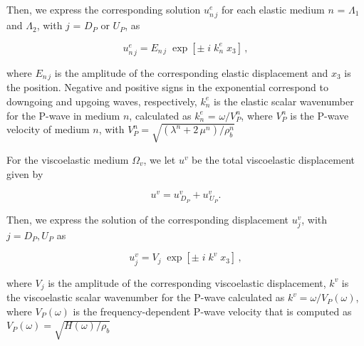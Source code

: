 \documentclass[draft]{agujournal2019}
\begin{document}
Then, we express the corresponding solution $u_{n\,j}^e$ for each elastic medium $n$ = $\Lambda_1$ and $\Lambda_2$, with $j$ = $D_P$ or $U_P$, as
\begin{linenomath*}
\begin{equation}\label{Eq.19}
u_{n\,j}^e = E_{n \,j} \;\exp[ \pm\; i \; k_{n}^e \; x_3 ]\,,
\end{equation}
\end{linenomath*}
where $E_{n \,j}$ is the amplitude of the corresponding elastic displacement and $x_3$ is the position. Negative and positive signs in the exponential correspond to downgoing and upgoing waves, respectively, $ k_{n}^e$ is the elastic scalar wavenumber for the P-wave in medium $n$, calculated as $ k_{n}^e$ = $\omega / V_P^n$, where $V_P^n$ is the P-wave velocity of medium $n$, with $V_P^n = \sqrt{(\lambda^n +  2\, \mu^n)/\rho_b^n}$

For the viscoelastic medium $\Omega_v$, we let  $u^v$ be the total viscoelastic displacement given by 
\begin{linenomath*}
\begin{equation}\label{Eq.20}
u^v=  u_{\,D_P}^v  + u_{\,U_P}^v.
\end{equation}
\end{linenomath*}

Then, we express the solution of the corresponding displacement $u_j^v$, with $j = D_P , U_P$ as
\begin{linenomath*}
\begin{equation}\label{Eq.21}
u_j^v = V_j \;\exp[ \pm\; i \; k^v \; x_3 ]\,,
\end{equation}
\end{linenomath*}
where $V_j$ is the amplitude of the corresponding viscoelastic displacement, $ k^v$ is the viscoelastic scalar wavenumber for the P-wave calculated as $ k^v=\omega / V_P(\omega)$, where $V_P(\omega)$ is the frequency-dependent P-wave velocity that is computed as $V_P(\omega) = \sqrt{H(\omega) /\rho_b }$
\end{document}
